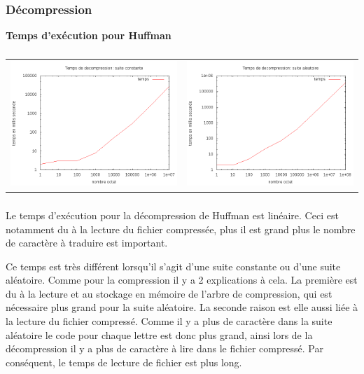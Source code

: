 \documentclass{report}
\begin{document}
\paragraph*{}
\subsubsection*{Décompression}
\textbf{Temps d’exécution pour Huffman}
\subparagraph*{}
\hspace{-2cm}\begin{tabular}{l | l}
\includegraphics[width=7cm]{tempsDhC.png} & 
\includegraphics[width=7cm]{tempsDhA.png}
\end{tabular}
\subparagraph*{}
Le temps d'exécution pour la décompression de Huffman est linéaire. Ceci est notamment du à la lecture du fichier compressée, plus il est grand plus le nombre de caractère à traduire est important. 

Ce temps est très différent lorsqu’il s'agit d'une suite constante ou d'une suite aléatoire. Comme pour la compression il y a 2 explications à cela. La première est du à la lecture et au stockage en mémoire de l'arbre de compression, qui est nécessaire plus grand pour la suite aléatoire. La seconde raison est elle aussi liée à la lecture du fichier compressé. Comme il y a plus de caractère dans la suite aléatoire le code pour chaque lettre est donc plus grand, ainsi lors de la décompression il y a plus de caractère à lire dans le fichier compressé. Par conséquent, le temps de lecture de fichier est plus long.  
\end{document}
